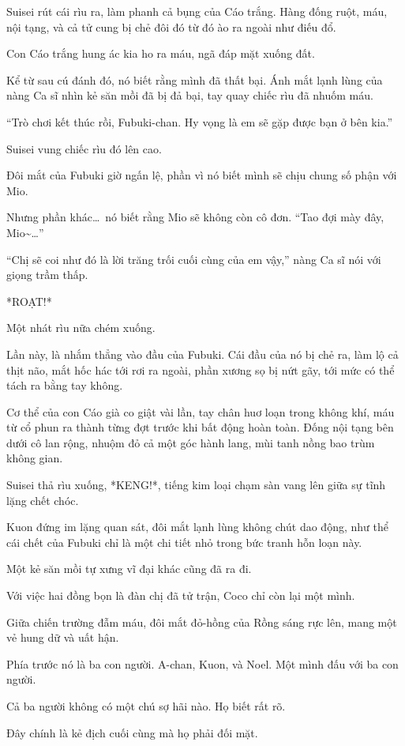 \documentclass[../main.tex]{subfiles}
\begin{document}
Suisei rút cái rìu ra, làm phanh cả bụng của Cáo trắng. Hàng đống ruột, máu, nội tạng, và cả tử cung bị chẻ đôi đó từ đó ào ra ngoài như điếu đổ.

Con Cáo trắng hung ác kia ho ra máu, ngã đáp mặt xuống đất.

Kể từ sau cú đánh đó, nó biết rằng mình đã thất bại. Ánh mắt lạnh lùng của nàng Ca sĩ nhìn kẻ săn mồi đã bị đả bại, tay quay chiếc rìu đã nhuốm máu.

``Trò chơi kết thúc rồi, Fubuki-chan. Hy vọng là em sẽ gặp được bạn ở bên kia.''

Suisei vung chiếc rìu đó lên cao.

Đôi mắt của Fubuki giờ ngấn lệ, phần vì nó biết mình sẽ chịu chung số phận với Mio.

Nhưng phần khác\dots\ nó biết rằng Mio sẽ không còn cô đơn. ``Tao đợi mày đây, Mio\~{}\dots''

``Chị sẽ coi như đó là lời trăng trối cuối cùng của em vậy,'' nàng Ca sĩ nói với giọng trầm thấp.

*ROẠT!*

Một nhát rìu nữa chém xuống.

Lần này, là nhắm thẳng vào đầu của Fubuki. Cái đầu của nó bị chẻ ra, làm lộ cả thịt não, mắt hốc hác tới rơi ra ngoài, phần xương sọ bị nứt gãy, tới mức có thể tách ra bằng tay không.

Cơ thể của con Cáo già co giật vài lần, tay chân huơ loạn trong không khí, máu từ cổ phun ra thành từng đợt trước khi bất động hoàn toàn. Đống nội tạng bên dưới cô lan rộng, nhuộm đỏ cả một góc hành lang, mùi tanh nồng bao trùm không gian.

Suisei thả rìu xuống, *KENG!*, tiếng kim loại chạm sàn vang lên giữa sự tĩnh lặng chết chóc.

Kuon đứng im lặng quan sát, đôi mắt lạnh lùng không chút dao động, như thể cái chết của Fubuki chỉ là một chi tiết nhỏ trong bức tranh hỗn loạn này.

Một kẻ săn mồi tự xưng vĩ đại khác cũng đã ra đi.

Với việc hai đồng bọn là đàn chị đã tử trận, Coco chỉ còn lại một mình.

Giữa chiến trường đẫm máu, đôi mắt đỏ-hồng của Rồng sáng rực lên, mang một vẻ hung dữ và uất hận.

Phía trước nó là ba con người. A-chan, Kuon, và Noel. Một mình đấu với ba con người.

Cả ba người không có một chú sợ hãi nào. Họ biết rất rõ.

Đây chính là kẻ địch cuối cùng mà họ phải đối mặt.
\end{document}
